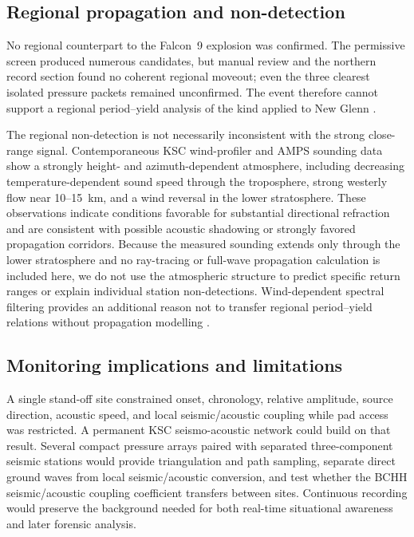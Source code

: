 \documentclass[]{seismica}
\begin{document}
\subsection{Regional propagation and non-detection}

No regional counterpart to the Falcon~9 explosion was confirmed. The
permissive screen produced numerous candidates, but manual review and the
northern record section found no coherent regional moveout; even the three
clearest isolated pressure packets remained unconfirmed. The event therefore
cannot support a regional period--yield analysis of the kind applied to New
Glenn \citep{silber_scamfer_newglenn_2026}.

The regional non-detection is not necessarily inconsistent with the strong
close-range signal. Contemporaneous KSC wind-profiler and AMPS sounding data
show a strongly height- and azimuth-dependent atmosphere, including decreasing
temperature-dependent sound speed through the troposphere, strong westerly
flow near 10--15~km, and a wind reversal in the lower stratosphere. These
observations indicate conditions favorable for substantial directional
refraction and are consistent with possible acoustic shadowing or strongly
favored propagation corridors. Because the measured sounding extends only
through the lower stratosphere and no ray-tracing or full-wave propagation
calculation is included here, we do not use the atmospheric structure to
predict specific return ranges or explain individual station
non-detections. Wind-dependent spectral filtering provides an additional
reason not to transfer regional period--yield relations without propagation
modelling \citep{silber_wind_filtering_2026}.

\subsection{Monitoring implications and limitations}

A single stand-off site constrained onset, chronology, relative amplitude,
source direction, acoustic speed, and local seismic/acoustic coupling while pad
access was restricted. A permanent KSC seismo-acoustic network could build on
that result. Several compact pressure arrays paired with separated
three-component seismic stations would provide triangulation and path sampling,
separate direct ground waves from local seismic/acoustic conversion, and test
whether the BCHH seismic/acoustic coupling coefficient transfers between sites. Continuous
recording would preserve the background needed for both real-time situational
awareness and later forensic analysis.
\end{document}
